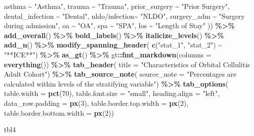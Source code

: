 \documentclass[
]{article}
\newenvironment{Shaded}{\begin{snugshade}}{\end{snugshade}}
\newcommand{\AttributeTok}[1]{\textcolor[rgb]{0.13,0.29,0.53}{#1}}
\newcommand{\DecValTok}[1]{\textcolor[rgb]{0.00,0.00,0.81}{#1}}
\newcommand{\FunctionTok}[1]{\textcolor[rgb]{0.13,0.29,0.53}{\textbf{#1}}}
\newcommand{\NormalTok}[1]{#1}
\newcommand{\SpecialCharTok}[1]{\textcolor[rgb]{0.81,0.36,0.00}{\textbf{#1}}}
\newcommand{\StringTok}[1]{\textcolor[rgb]{0.31,0.60,0.02}{#1}}
\begin{document}
\begin{Shaded}
\begin{Highlighting}[]
\NormalTok{      asthma }\SpecialCharTok{\textasciitilde{}} \StringTok{"Asthma"}\NormalTok{,}
\NormalTok{      trauma }\SpecialCharTok{\textasciitilde{}} \StringTok{"Trauma"}\NormalTok{,}
\NormalTok{      prior\_surgery }\SpecialCharTok{\textasciitilde{}} \StringTok{"Prior Surgery"}\NormalTok{,}
\NormalTok{      dental\_infection }\SpecialCharTok{\textasciitilde{}} \StringTok{"Dental"}\NormalTok{,}
      \StringTok{\textasciigrave{}}\AttributeTok{nldo/infection}\StringTok{\textasciigrave{}}\SpecialCharTok{\textasciitilde{}} \StringTok{"NLDO"}\NormalTok{,}
\NormalTok{      surgery\_adm }\SpecialCharTok{\textasciitilde{}} \StringTok{"Surgery during admission"}\NormalTok{,}
\NormalTok{      oa }\SpecialCharTok{\textasciitilde{}} \StringTok{"OA"}\NormalTok{,}
\NormalTok{      spa }\SpecialCharTok{\textasciitilde{}} \StringTok{"SPA"}\NormalTok{,}
\NormalTok{      los }\SpecialCharTok{\textasciitilde{}} \StringTok{"Length of Stay"}
\NormalTok{      )) }\SpecialCharTok{\%\textgreater{}\%}
  \FunctionTok{add\_overall}\NormalTok{() }\SpecialCharTok{\%\textgreater{}\%} \FunctionTok{bold\_labels}\NormalTok{() }\SpecialCharTok{\%\textgreater{}\%} \FunctionTok{italicize\_levels}\NormalTok{() }\SpecialCharTok{\%\textgreater{}\%} \FunctionTok{add\_n}\NormalTok{() }\SpecialCharTok{\%\textgreater{}\%}
  \FunctionTok{modify\_spanning\_header}\NormalTok{(}
    \FunctionTok{c}\NormalTok{(}\StringTok{"stat\_1"}\NormalTok{, }\StringTok{"stat\_2"}\NormalTok{) }\SpecialCharTok{\textasciitilde{}} \StringTok{"**ICE**"}\NormalTok{) }\SpecialCharTok{\%\textgreater{}\%}
  \FunctionTok{as\_gt}\NormalTok{() }\SpecialCharTok{\%\textgreater{}\%}
\NormalTok{  gt}\SpecialCharTok{::}\FunctionTok{fmt\_markdown}\NormalTok{(}\AttributeTok{columns =} \FunctionTok{everything}\NormalTok{()) }\SpecialCharTok{\%\textgreater{}\%}
  \FunctionTok{tab\_header}\NormalTok{(}
    \AttributeTok{title =} \StringTok{"Characteristics of Orbital Cellulitis Adult Cohort"}\NormalTok{) }\SpecialCharTok{\%\textgreater{}\%} 
    \FunctionTok{tab\_source\_note}\NormalTok{(}
    \AttributeTok{source\_note =} \StringTok{"Percentages are calculated within levels of the stratifying }
\StringTok{    variable"}\NormalTok{) }\SpecialCharTok{\%\textgreater{}\%}
  \FunctionTok{tab\_options}\NormalTok{(}
    \AttributeTok{table.width =} \FunctionTok{pct}\NormalTok{(}\DecValTok{70}\NormalTok{),}
    \AttributeTok{table.font.size =} \StringTok{"small"}\NormalTok{,}
    \AttributeTok{heading.align =} \StringTok{"left"}\NormalTok{,}
    \AttributeTok{data\_row.padding =} \FunctionTok{px}\NormalTok{(}\DecValTok{3}\NormalTok{),}
    \AttributeTok{table.border.top.width =} \FunctionTok{px}\NormalTok{(}\DecValTok{2}\NormalTok{),}
    \AttributeTok{table.border.bottom.width =} \FunctionTok{px}\NormalTok{(}\DecValTok{2}\NormalTok{))}

\NormalTok{tbl4}
\end{Highlighting}
\end{Shaded}
\end{document}
